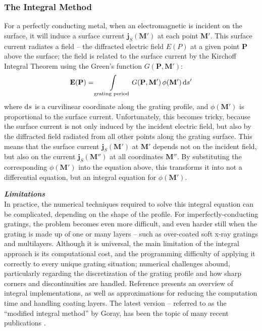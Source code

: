 \subsubsection{The Integral Method}
For a perfectly conducting metal, when an electromagnetic is incident on the surface, it will induce a surface current $\mathbf{j}_S(\mathbf{M}')$ at each point $\mathbf{M}'$.  This surface current radiates a field -- the diffracted electric field $E(P)$ at a given point $\mathbf{P}$ above the surface; the field is related to the surface current by the Kirchoff Integral Theorem \cite{Kir83} using the Green's function $G(\mathbf{P}, \mathbf{M}')$:
\begin{eqnarray}
\mathbf{E}(\mathbf{P}) = \int\limits_{\textrm{grating period}} G(\mathbf{P}, \mathbf{M}')\, \phi(\mathbf{M}')\, \mathrm{d} s'
\end{eqnarray}
where $\mathrm{d} s$ is a curvilinear coordinate along the grating profile, and $\phi(\mathbf{M'})$ is proportional to the surface current.  Unfortunately, this becomes tricky, because the surface current is not only induced by the incident electric field, but also by the diffracted field radiated from all other points along the grating surface.  This means that the surface current $\mathbf{j}_S(\mathbf{M}')$ at $\mathbf{M}'$ depends not on the incident field, but also on the current $\mathbf{j}_S(\mathbf{M}'')$ at all coordinates $\mathbf{M}''$.  By substituting the corresponding $\phi(\mathbf{M'})$ into the equation above, this transforms it into not a differential equation, but an integral equation for $\phi(\mathbf{M'})$.  

\noindent\textbf{\emph{Limitations}}\\
In practice, the numerical techniques required to solve this integral equation can be complicated, depending on the shape of the profile.  For imperfectly-conducting gratings, the problem becomes even more difficult, and even harder still when the grating is made up of one or many layers -- such as over-coated soft x-ray gratings and multilayers.  Although it is universal, the main limitation of the integral approach is its computational cost, and the programming difficulty of applying it correctly to every unique grating situation; numerical challenges abound, particularly regarding the discretization of the grating profile and how sharp corners and discontinuities are handled.  Reference \cite{Pom91} presents an overview of integral implementations, as well as approximations for reducing the computation time and handling coating layers. The latest version -- referred to as the ``modified integral method'' by Goray, has been the topic of many recent publications \cite{Gor02} \cite {Gor02b} \cite{See02} \cite{Gor05}.

